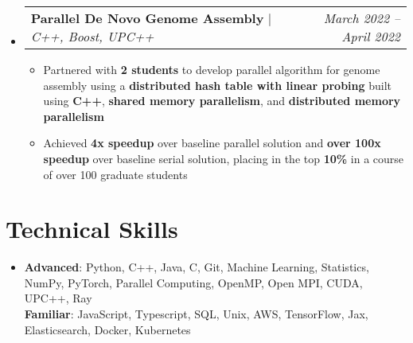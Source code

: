 \documentclass[letterpaper,11pt]{article}
\makeatletter
\newcommand{\resumeItem}[1]{
  \item\small{
    {#1 \vspace{-2pt}}
  }
}
\newcommand{\resumeProjectHeading}[2]{
    \item
    \begin{tabular*}{0.97\textwidth}{l@{\extracolsep{\fill}}r}
      \small#1 & \emph{#2} \\
    \end{tabular*}\vspace{-7pt}
}
\newcommand{\resumeSubHeadingListStart}{\begin{itemize}[leftmargin=0.15in, label={}]}
\newcommand{\resumeSubHeadingListEnd}{\end{itemize}}
\newcommand{\resumeItemListStart}{\begin{itemize}}
\newcommand{\resumeItemListEnd}{\end{itemize}\vspace{-5pt}}
\makeatother
\begin{document}
\resumeSubHeadingListStart
    \resumeProjectHeading
    {\textbf{Parallel De Novo Genome Assembly} $|$ \emph{C++, Boost, UPC++}}{March 2022 -- April 2022}
    \resumeItemListStart
        \resumeItem{Partnered with \textbf{2 students} to develop parallel algorithm for genome assembly using a \textbf{distributed hash table with linear probing} built using \textbf{C++}, \textbf{shared memory parallelism}, and \textbf{distributed memory parallelism}}
        \resumeItem{Achieved \textbf{4x speedup} over baseline parallel solution and \textbf{over 100x speedup} over baseline serial solution, placing in the top \textbf{10\%} in a course of over 100 graduate students}
    \resumeItemListEnd

\resumeSubHeadingListEnd


\section{Technical Skills}

\begin{itemize}[leftmargin=0.15in, label={}]
    \item{
    
    \textbf{Advanced}: Python, C++, Java, C, Git, Machine Learning, Statistics, NumPy, PyTorch, Parallel Computing, OpenMP, Open MPI, CUDA, UPC++, Ray \\
    
    \textbf{Familiar}: JavaScript, Typescript, SQL, Unix, AWS, TensorFlow, Jax, Elasticsearch, Docker, Kubernetes
    
    }
\end{itemize}
\end{document}
